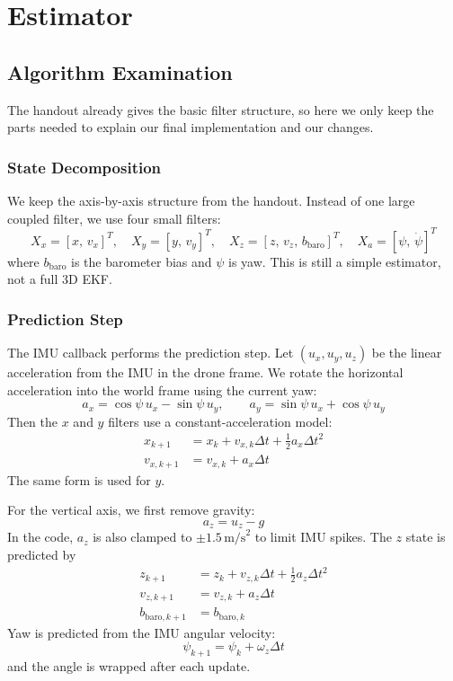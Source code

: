 \documentclass[12pt,twoside,letterpaper]{article}
\begin{document}
\section{Estimator}

\subsection{Algorithm Examination}

The handout already gives the basic filter structure, so here we only keep the parts needed to explain our final implementation and our changes.

\subsubsection{State Decomposition}

We keep the axis-by-axis structure from the handout. Instead of one large coupled filter, we use four small filters:
\[
    X_x = [x,\, v_x]^T,\quad
    X_y = [y,\, v_y]^T,\quad
    X_z = [z,\, v_z,\, b_{\text{baro}}]^T,\quad
    X_a = [\psi,\, \dot{\psi}]^T
\]
where $b_{\text{baro}}$ is the barometer bias and $\psi$ is yaw. This is still a simple estimator, not a full 3D EKF.

\subsubsection{Prediction Step}

The IMU callback performs the prediction step. Let $(u_x, u_y, u_z)$ be the linear acceleration from the IMU in the drone frame. We rotate the horizontal acceleration into the world frame using the current yaw:
\[
    a_x = \cos \psi \, u_x - \sin \psi \, u_y,\qquad
    a_y = \sin \psi \, u_x + \cos \psi \, u_y
\]
Then the $x$ and $y$ filters use a constant-acceleration model:
\[
    \begin{aligned}
        x_{k+1} &= x_k + v_{x,k}\Delta t + \frac{1}{2} a_x \Delta t^2 \\
        v_{x,k+1} &= v_{x,k} + a_x \Delta t
    \end{aligned}
\]
The same form is used for $y$.

For the vertical axis, we first remove gravity:
\[
    a_z = u_z - g
\]
In the code, $a_z$ is also clamped to $\pm 1.5\,\text{m/s}^2$ to limit IMU spikes. The $z$ state is predicted by
\[
    \begin{aligned}
        z_{k+1} &= z_k + v_{z,k}\Delta t + \frac{1}{2} a_z \Delta t^2 \\
        v_{z,k+1} &= v_{z,k} + a_z \Delta t \\
        b_{\text{baro},k+1} &= b_{\text{baro},k}
    \end{aligned}
\]
Yaw is predicted from the IMU angular velocity:
\[
    \psi_{k+1} = \psi_k + \omega_z \Delta t
\]
and the angle is wrapped after each update.
\end{document}
